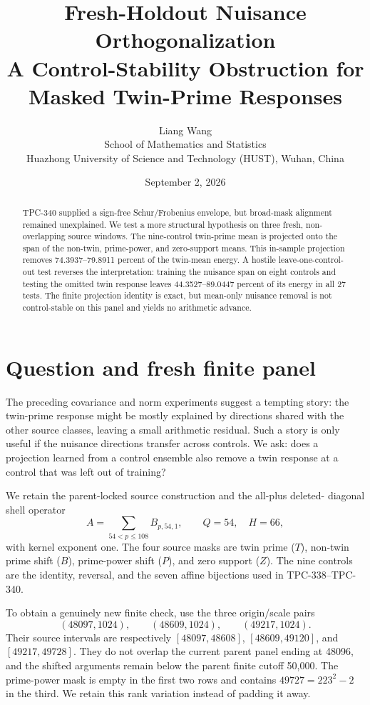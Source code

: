 \documentclass[10pt]{article}
\title{Fresh-Holdout Nuisance Orthogonalization\\
\large A Control-Stability Obstruction for Masked Twin-Prime Responses}
\author{Liang Wang\\School of Mathematics and Statistics\\
Huazhong University of Science and Technology (HUST), Wuhan, China}
\date{September 2, 2026}
\begin{document}
\maketitle

\begin{abstract}
TPC-340 supplied a sign-free Schur/Frobenius envelope, but broad-mask
alignment remained unexplained.  We test a more structural hypothesis on
three fresh, non-overlapping source windows.  The nine-control twin-prime mean
is projected onto the span of the non-twin, prime-power, and zero-support
means.  This in-sample projection removes 74.3937--79.8911 percent of the
twin-mean energy.  A hostile leave-one-control-out test reverses the
interpretation: training the nuisance span on eight controls and testing the
omitted twin response leaves 44.3527--89.0447 percent of its energy in all 27
tests.  The finite projection identity is exact, but mean-only nuisance
removal is not control-stable on this panel and yields no arithmetic advance.
\end{abstract}

\section{Question and fresh finite panel}

The preceding covariance and norm experiments suggest a tempting story: the
twin-prime response might be mostly explained by directions shared with the
other source classes, leaving a small arithmetic residual.  Such a story is
only useful if the nuisance directions transfer across controls.  We ask:
does a projection learned from a control ensemble also remove a twin response
at a control that was left out of training?

We retain the parent-locked source construction and the all-plus deleted-
diagonal shell operator
\[
 A=\sum_{54<p\leq108}B_{p,54,1},\qquad Q=54,\quad H=66,
\]
with kernel exponent one.  The four source masks are twin prime ($T$),
non-twin prime shift ($B$), prime-power shift ($P$), and zero support ($Z$).
The nine controls are the identity, reversal, and the seven affine bijections
used in TPC-338--TPC-340.

To obtain a genuinely new finite check, use the three origin/scale pairs
\[
 (48097,1024),\qquad(48609,1024),\qquad(49217,1024).
\]
Their source intervals are respectively
\([48097,48608]\), \([48609,49120]\), and \([49217,49728]\).  They do not
overlap the current parent panel ending at 48096, and the shifted arguments
remain below the parent finite cutoff 50,000.  The prime-power mask is empty
in the first two rows and contains $49727=223^2-2$ in the third.  We retain
this rank variation instead of padding it away.
\end{document}
